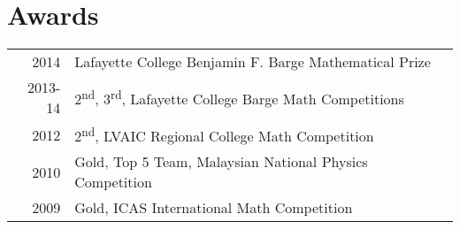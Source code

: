 \documentclass{deedy-resume-openfont}
\begin{document}
\begin{minipage}[t]{0.66\textwidth}

\section{Awards}
\begin{tabular}{rll}
2014	     & Lafayette College Benjamin F. Barge Mathematical Prize\\
2013-14	     & 2\textsuperscript{nd}, 3\textsuperscript{rd}, Lafayette College Barge Math Competitions\\
2012	     & 2\textsuperscript{nd}, LVAIC Regional College Math Competition\\
2010     & Gold, Top 5 Team, Malaysian National Physics Competition  \\
2009     & Gold, ICAS International Math Competition \\
\end{tabular}
\sectionsep


\renewcommand\refname{\vskip -1.5cm} %


\nocite{*}

\end{minipage}
\end{document}

